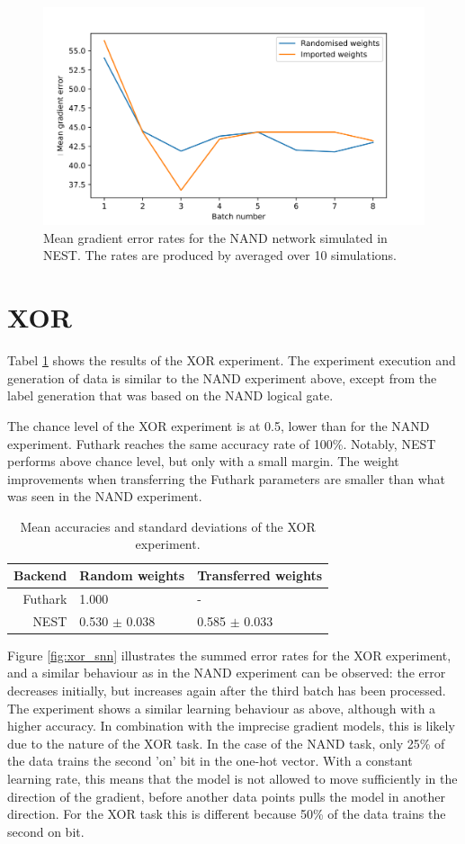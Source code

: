 \documentclass[report.tex]{subfiles}
\begin{document}
\begin{figure}
  \includegraphics[width=\linewidth]{images/nand.png}
  \caption{Mean gradient error rates for the NAND network simulated in NEST. The rates
  are produced by averaged over 10 simulations.}
  \label{fig:nand_snn}
\end{figure}
\FloatBarrier

\section{XOR}
Tabel \ref{tab:xor} shows the results of the XOR experiment.
The experiment execution and generation of data is similar to the NAND
experiment above, except from the label generation that was based on the NAND
logical gate.

The chance level of the XOR experiment is at 0.5, lower than for the NAND
experiment.
Futhark reaches the same accuracy rate of 100\%.
Notably, NEST performs above chance level, but only with a small margin. The 
weight improvements when transferring the Futhark parameters are smaller than 
what was seen in the NAND experiment.

\begin{table}
  \begin{tabular}{r l l}
  Backend & Random weights & Transferred weights \\ \hline
  Futhark & 1.000 & - \\ 
  NEST & 0.530 $\pm$ 0.038 & 0.585 $\pm$ 0.033 \\
  \end{tabular}
  \caption{Mean accuracies and standard deviations of the XOR experiment.}
  \label{tab:xor}
\end{table}

Figure \ref{fig:xor_snn} illustrates the summed error rates for the XOR
experiment, and a similar behaviour as in the NAND experiment can be observed:
the error decreases initially, but increases again after the third batch has
been processed.
The experiment shows a similar learning behaviour as above, although with a
higher accuracy.
In combination with the imprecise gradient models, this is likely due to the
nature of the XOR task.
In the case of the NAND task, only 25\% of the data trains the second 'on' bit
in the one-hot vector. 
With a constant learning rate, this means that the model is not allowed to move
sufficiently in the direction of the gradient, before another data points pulls
the model in another direction. 
For the XOR task this is different because 50\% of the data trains the second on
bit.
\end{document}
